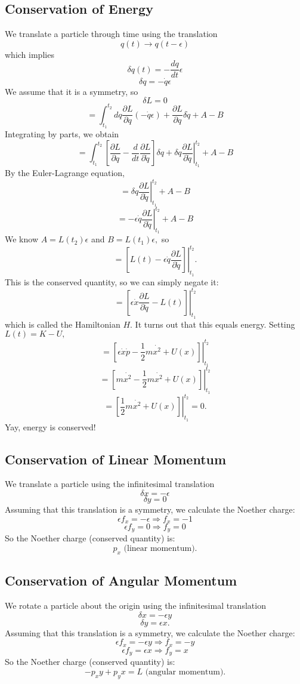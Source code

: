 \documentclass[11pt]{article}
\begin{document}
\subsection{Conservation of Energy}
We translate a particle through time using the translation
$$q(t)\rightarrow q(t-\epsilon)$$
which implies
$$\delta q(t)=-\frac{dq}{dt}\epsilon$$
$$\delta q = -\dot{q}\epsilon$$
We assume that it is a symmetry, so
$$\delta L = 0$$
$$=\int_{t_1}^{t_2} dq \frac{\partial L}{\partial q}(-\dot{q}\epsilon) + \frac{\partial L}{\partial q}\delta \dot{q} + A-B$$
Integrating by parts, we obtain
$$=\int_{t_1}^{t_2}  [\frac{\partial L}{\partial q}- \frac{d}{dt}\frac{\partial L}{\partial \dot{q}}]\delta q+ \left. \delta q \frac{\partial L}{\partial \dot{q}} \right|_{t_1}^{t_2}+A-B$$
By the Euler-Lagrange equation,
$$= \left. \delta q \frac{\partial L}{\partial \dot{q}} \right|_{t_1}^{t_2}+A-B$$
$$=\left. -\epsilon \dot{q} \frac{\partial L}{\partial \dot{q}} \right|_{t_1}^{t_2}+A-B$$
We know $A=L(t_2)\epsilon$ and $B=L(t_1)\epsilon,$ so 
$$=\left. [L(t) -\epsilon \dot{q} \frac{\partial L}{\partial \dot{q}}] \right|_{t_1}^{t_2}.$$
This is the conserved quantity, so we can simply negate it:
$$=\left. [\epsilon \dot{x} \frac{\partial L}{\partial \dot{q}}-L(t)] \right|_{t_1}^{t_2}$$
which is called the Hamiltonian $H$.
It turns out that this equals energy.
Setting $L(t)=K-U,$
$$=\left. [\epsilon \dot{x}\dot{p}-\frac{1}{2}m\dot{x^2}+U(x)] \right|_{t_1}^{t_2}$$
$$=\left. [m\dot{x^2}-\frac{1}{2}m\dot{x^2}+U(x)] \right|_{t_1}^{t_2}$$
$$=\left. [\frac{1}{2}m\dot{x^2}+U(x)] \right|_{t_1}^{t_2}=0.$$
Yay, energy is conserved!

\subsection{Conservation of Linear Momentum}
We translate a particle using the infinitesimal translation
$$ \delta x = -\epsilon$$
$$ \delta y = 0$$
Assuming that this translation is a symmetry, we calculate the Noether charge:
$$\epsilon f_x=-\epsilon \Rightarrow f_x=-1$$
$$\epsilon f_y = 0 \Rightarrow f_y=0$$
So the Noether charge (conserved quantity) is:
$$p_x\textrm{ (linear momentum).}$$
\subsection{Conservation of Angular Momentum}
We rotate a particle about the origin using the infinitesimal translation
$$ \delta x = -\epsilon y$$
$$ \delta y = \epsilon x.$$
Assuming that this translation is a symmetry, we calculate the Noether charge:
$$\epsilon f_x=-\epsilon y \Rightarrow f_x=-y$$
$$\epsilon f_y = \epsilon x \Rightarrow f_y=x$$
So the Noether charge (conserved quantity) is:
$$-p_xy+p_yx=L\textrm{ (angular momentum).}$$
\end{document}

